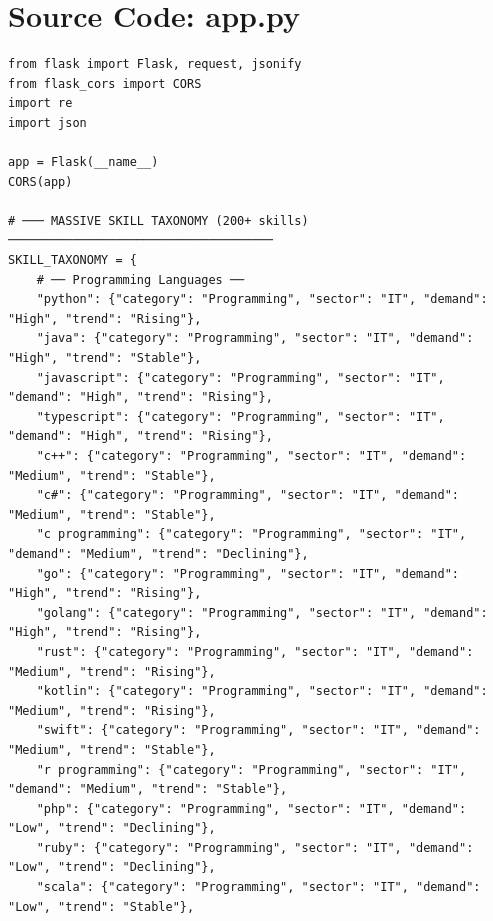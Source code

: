 \documentclass[12pt,a4paper]{report}
\begin{document}
\section*{Source Code: app.py}
\begin{verbatim}
from flask import Flask, request, jsonify
from flask_cors import CORS
import re
import json

app = Flask(__name__)
CORS(app)

# ─── MASSIVE SKILL TAXONOMY (200+ skills) ─────────────────────────────────────
SKILL_TAXONOMY = {
    # ── Programming Languages ──
    "python": {"category": "Programming", "sector": "IT", "demand": "High", "trend": "Rising"},
    "java": {"category": "Programming", "sector": "IT", "demand": "High", "trend": "Stable"},
    "javascript": {"category": "Programming", "sector": "IT", "demand": "High", "trend": "Rising"},
    "typescript": {"category": "Programming", "sector": "IT", "demand": "High", "trend": "Rising"},
    "c++": {"category": "Programming", "sector": "IT", "demand": "Medium", "trend": "Stable"},
    "c#": {"category": "Programming", "sector": "IT", "demand": "Medium", "trend": "Stable"},
    "c programming": {"category": "Programming", "sector": "IT", "demand": "Medium", "trend": "Declining"},
    "go": {"category": "Programming", "sector": "IT", "demand": "High", "trend": "Rising"},
    "golang": {"category": "Programming", "sector": "IT", "demand": "High", "trend": "Rising"},
    "rust": {"category": "Programming", "sector": "IT", "demand": "Medium", "trend": "Rising"},
    "kotlin": {"category": "Programming", "sector": "IT", "demand": "Medium", "trend": "Rising"},
    "swift": {"category": "Programming", "sector": "IT", "demand": "Medium", "trend": "Stable"},
    "r programming": {"category": "Programming", "sector": "IT", "demand": "Medium", "trend": "Stable"},
    "php": {"category": "Programming", "sector": "IT", "demand": "Low", "trend": "Declining"},
    "ruby": {"category": "Programming", "sector": "IT", "demand": "Low", "trend": "Declining"},
    "scala": {"category": "Programming", "sector": "IT", "demand": "Low", "trend": "Stable"},


\end{verbatim}
\end{document}
